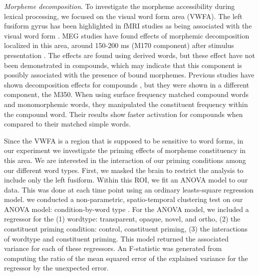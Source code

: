 \documentclass{frontiersSCNS}
\begin{document}
\textit{Morpheme decomposition}. To investigate the morpheme accessibility during lexical processing, we focused on the visual word form area (VWFA). The left fusiform gyrus has been highlighted in fMRI studies as being associated with the visual word form \citep{Cohen:2004, Dehaene:2010}. MEG studies have found effects of morphemic decomposition localized in this area, around 150-200 ms (M170 component) after stimulus presentation \citep*{Zweig:2009, Lewis:2011, Solomyak:2010}.  The effects are found using derived words, but these effect have not been demonstrated in compounds, which may indicate that this component is possibly associated with the presence of bound morphemes.  Previous studies have shown decomposition effects for compounds \citep{Fiorentino:2007, Fiorentino:2009}, but they were shown in a different component, the M350.  When using surface frequency matched compound words and monomorphemic words, they manipulated the constituent frequency within the compound word. Their results show faster activation for compounds when compared to their matched simple words. 
 
Since the VWFA is a region that is supposed to be sensitive to word forms, in our experiment we investigate the priming effects of morpheme constituency in this area. We are interested in the interaction of our priming conditions among our different word types. First, we masked the brain to restrict the analysis to include only the left fusiform. Within this ROI, we fit an ANOVA model to our data. This was done at each time point using an ordinary leasts-square regression model. 
we conducted a non-parametric, spatio-temporal clustering test on our ANOVA model: condition-by-word type \citep*{Maris:2007}. For the ANOVA model, we included a regressor for the (1) wordtype: transparent, opaque, novel, and ortho, (2) the constituent priming condition: control, constituent priming, (3) the interactions of wordtype and constituent priming. This model returned the associated variance for each of these regressors. An F-statistic was generated from computing the ratio of the mean squared error of the explained variance for the regressor by the unexpected error. 
\end{document}
